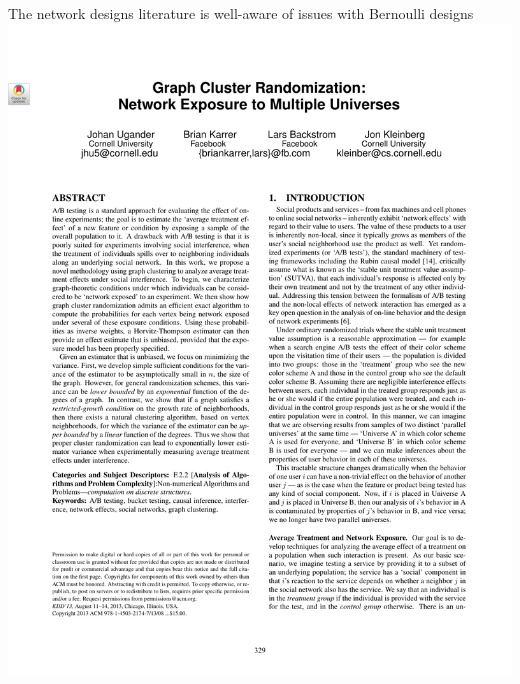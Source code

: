 \documentclass[aspectratio=169]{beamer}
\theoremstyle{remark}
\begin{document}
\begin{frame}{The network designs literature is well-aware of issues with Bernoulli designs}
    \vfill
    \centering
    \includegraphics[height=0.9\textheight, page=1, trim={1.5cm 8.5cm 0 2cm}, clip]{./papers/gcr.pdf}
\end{frame}
\end{document}
